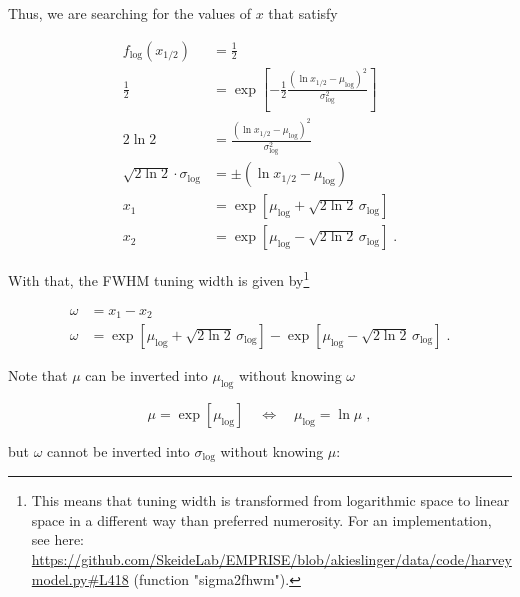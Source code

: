 \documentclass[a4paper,12pt]{article}
\begin{document}
\pagebreak
Thus, we are searching for the values of $x$ that satisfy

\vspace{-0.5em}
\begin{equation} \label{eq:fwhm-x12}
\begin{split}
f_\mathrm{log}(x_{1/2}) &= \frac{1}{2} \\
\frac{1}{2} &= \exp \left[ -\frac{1}{2} \frac{(\ln x_{1/2} - \mu_\mathrm{log})^2}{\sigma_\mathrm{log}^2} \right] \\
2 \ln 2 &= \frac{(\ln x_{1/2} - \mu_\mathrm{log})^2}{\sigma_\mathrm{log}^2} \\
\sqrt{2 \ln 2} \cdot \sigma_\mathrm{log} &= \pm (\ln x_{1/2} - \mu_\mathrm{log}) \\
x_1 &= \exp \left[ \mu_\mathrm{log} + \sqrt{2 \ln 2} \, \sigma_\mathrm{log} \right] \\
x_2 &= \exp \left[ \mu_\mathrm{log} - \sqrt{2 \ln 2} \, \sigma_\mathrm{log} \right] \; .
\end{split}
\end{equation}

With that, the FWHM tuning width is given by\footnote{This means that tuning width is transformed from logarithmic space to linear space in a different way than preferred numerosity. For an implementation, see here: \url{https://github.com/SkeideLab/EMPRISE/blob/akieslinger/data/code/harveymodel.py#L418} (function "sigma2fhwm").} 

\vspace{-0.5em}
\begin{equation} \label{eq:fwhm-qed}
\begin{split}
\omega &= x_1 - x_2 \\
\omega &= \exp \left[ \mu_\mathrm{log} + \sqrt{2 \ln 2} \, \sigma_\mathrm{log} \right] - \exp \left[ \mu_\mathrm{log} - \sqrt{2 \ln 2} \, \sigma_\mathrm{log} \right] \; .
\end{split}
\end{equation}

Note that $\mu$ can be inverted into $\mu_\mathrm{log}$ without knowing $\omega$

\begin{equation} \label{eq:mu-log-mu}
\mu = \exp \left[ \mu_\mathrm{log} \right] \quad \Leftrightarrow \quad \mu_\mathrm{log} = \ln \mu \; ,
\end{equation}

but $\omega$ cannot be inverted into $\sigma_\mathrm{log}$ without knowing $\mu$:
\end{document}
